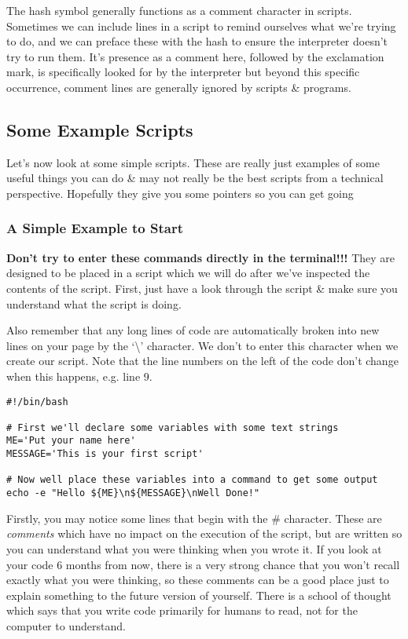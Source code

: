 \begin{note}
The hash symbol generally functions as a comment character in scripts.
Sometimes we can include lines in a script to remind ourselves what we're trying to do, and we can preface these with the hash to ensure the interpreter doesn't try to run them.
It's presence as a comment here, followed by the exclamation mark, is specifically looked for by the interpreter but beyond this specific occurrence, comment lines are generally ignored by scripts \& programs.
\end{note}

\subsection{Some Example Scripts}
Let's now look at some simple scripts.
These are really just examples of some useful things you can do \& may not really be the best scripts from a technical perspective.
Hopefully they give you some pointers so you can get going


\subsubsection*{A Simple Example to Start}
\begin{warning}
\textbf{Don't try to enter these commands directly in the terminal!!!}
They are designed to be placed in a script which we will do after we've inspected the contents of the script.
First,  just have a look through the script \& make sure you understand what the script is doing.

Also remember that any long lines of code are automatically broken into new lines on your page by the `\textbackslash ' character.
We don't to enter this character when we create our script.
Note that the line numbers on the left of the code don't change when this happens, e.g. line 9.
\end{warning}

\begin{lstlisting}
#!/bin/bash

# First we'll declare some variables with some text strings
ME='Put your name here'
MESSAGE='This is your first script'

# Now well place these variables into a command to get some output
echo -e "Hello ${ME}\n${MESSAGE}\nWell Done!"
\end{lstlisting}

\begin{information}
Firstly, you may notice some lines that begin with the \# character.
These are \textit{comments} which have no impact on the execution of the script, but are written so you can understand what you were thinking when you wrote it.
If you look at your code 6 months from now, there is a very strong chance that you won't recall exactly what you were thinking, so these comments can be a good place just to explain something to the future version of yourself.
There is a school of thought which says that you write code primarily for humans to read, not for the computer to understand.
\end{information}

